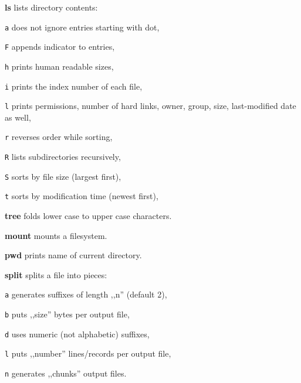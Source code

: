 \begin{enumx}
	\item [\cmd] \textbf{ls} lists directory contents:
	\item [\texttt{a}] does not ignore entries starting with dot, 
	\item [\texttt{F}] appends indicator to entries, 
	\item [\texttt{h}] prints human readable sizes, 
	\item [\texttt{i}] prints the index number of each file, 
	\item [\texttt{l}] prints permissions, number of hard links, owner, group, size, last-modified date as well, 
	\item [\texttt{r}] reverses order while sorting,
	\item [\texttt{R}] lists subdirectories recursively, 
	\item [\texttt{S}] sorts by file size (largest first), 
	\item [\texttt{t}] sorts by modification time (newest first), 
	\item [\cmd] \textbf{tree} folds lower case to upper case characters.
\end{enumx}

\begin{enumx}
	\item [\cmd] \textbf{mount} mounts a filesystem.
\end{enumx}

\begin{enumx}
	\item [\cmd] \textbf{pwd} prints name of current directory.
\end{enumx}

\begin{enumx}
	\item [\cmd] \textbf{split} splits a file into pieces:
	\item [\texttt{a}] generates suffixes of length ,,n'' (default 2),
	\item [\texttt{b}] puts ,,size'' bytes per output file,
	\item [\texttt{d}] uses numeric (not alphabetic) suffixes,
	\item [\texttt{l}] puts ,,number'' lines/records per output file,
	\item [\texttt{n}] generates ,,chunks'' output files.
\end{enumx}

